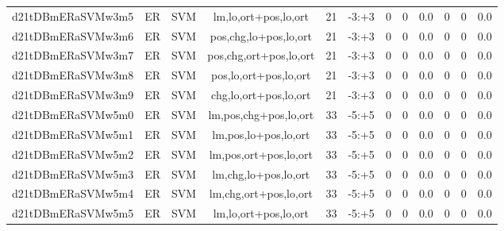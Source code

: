 \documentclass[a4paper]{article}
\begin{document}
\begin{landscape}
\begin{center}
\begin{tabular}{ |c|c|c|c|c|c|c|c|c|c|c|c|}
 
 	
 	\small{ d21tDBmERaSVMw3m5 } & ER & SVM & lm,lo,ort+pos,lo,ort  &  21 &  -3:+3  &  0 & 0 & 0.0  &  0 & 0 & 0.0 \\
 	

 
 	
 	\small{ d21tDBmERaSVMw3m6 } & ER & SVM & pos,chg,lo+pos,lo,ort  &  21 &  -3:+3  &  0 & 0 & 0.0  &  0 & 0 & 0.0 \\
 	

 
 	
 	\small{ d21tDBmERaSVMw3m7 } & ER & SVM & pos,chg,ort+pos,lo,ort  &  21 &  -3:+3  &  0 & 0 & 0.0  &  0 & 0 & 0.0 \\
 	

 
 	
 	\small{ d21tDBmERaSVMw3m8 } & ER & SVM & pos,lo,ort+pos,lo,ort  &  21 &  -3:+3  &  0 & 0 & 0.0  &  0 & 0 & 0.0 \\
 	

 
 	
 	\small{ d21tDBmERaSVMw3m9 } & ER & SVM & chg,lo,ort+pos,lo,ort  &  21 &  -3:+3  &  0 & 0 & 0.0  &  0 & 0 & 0.0 \\
 	

 
 	
 	\small{ d21tDBmERaSVMw5m0 } & ER & SVM & lm,pos,chg+pos,lo,ort  &  33 &  -5:+5  &  0 & 0 & 0.0  &  0 & 0 & 0.0 \\
 	

 
 	
 	\small{ d21tDBmERaSVMw5m1 } & ER & SVM & lm,pos,lo+pos,lo,ort  &  33 &  -5:+5  &  0 & 0 & 0.0  &  0 & 0 & 0.0 \\
 	

 
 	
 	\small{ d21tDBmERaSVMw5m2 } & ER & SVM & lm,pos,ort+pos,lo,ort  &  33 &  -5:+5  &  0 & 0 & 0.0  &  0 & 0 & 0.0 \\
 	

 
 	
 	\small{ d21tDBmERaSVMw5m3 } & ER & SVM & lm,chg,lo+pos,lo,ort  &  33 &  -5:+5  &  0 & 0 & 0.0  &  0 & 0 & 0.0 \\
 	

 
 	
 	\small{ d21tDBmERaSVMw5m4 } & ER & SVM & lm,chg,ort+pos,lo,ort  &  33 &  -5:+5  &  0 & 0 & 0.0  &  0 & 0 & 0.0 \\
 	

 
 	
 	\small{ d21tDBmERaSVMw5m5 } & ER & SVM & lm,lo,ort+pos,lo,ort  &  33 &  -5:+5  &  0 & 0 & 0.0  &  0 & 0 & 0.0 \\
 	


\end{tabular}
\end{center}
\end{landscape}
\end{document}
